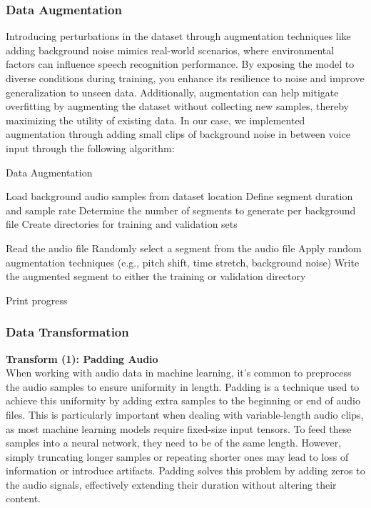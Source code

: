 \documentclass[a4paper]{report}
\begin{document}
{\subsubsection{Data Augmentation}
Introducing perturbations in the dataset through augmentation techniques like adding background noise mimics real-world scenarios, where environmental factors can influence speech recognition performance. By exposing the model to diverse conditions during training, you enhance its resilience to noise and improve generalization to unseen data. Additionally, augmentation can help mitigate overfitting by augmenting the dataset without collecting new samples, thereby maximizing the utility of existing data. In our case, we implemented augmentation through adding small clips of background noise in between voice input through the following algorithm:
\begin{center}
\begin{algorithm}
\caption{Data Augmentation}\label{alg:data_augmentation}
\begin{algorithmic}[0]
        \State Load background audio samples from dataset location
        \State Define segment duration and sample rate
        \State Determine the number of segments to generate per background file
        \State Create directories for training and validation sets

            \State Read the audio file
                \State Randomly select a segment from the audio file
                \State Apply random augmentation techniques (e.g., pitch shift, time stretch, background noise)
                \State Write the augmented segment to either the training or validation directory
            \EndFor
        \EndFor

        \State Print progress
    \EndProcedure
\end{algorithmic}
\end{algorithm}
\end{center}
\subsubsection{Data Transformation}
\textbf{Transform (1): Padding Audio}\\

When working with audio data in machine learning, it's common to preprocess the audio samples to ensure uniformity in length. Padding is a technique used to achieve this uniformity by adding extra samples to the beginning or end of audio files. This is particularly important when dealing with variable-length audio clips, as most machine learning models require fixed-size input tensors.
To feed these samples into a neural network, they need to be of the same length. However, simply truncating longer samples or repeating shorter ones may lead to loss of information or introduce artifacts. Padding solves this problem by adding zeros to the audio signals, effectively extending their duration without altering their content.

}
\end{document}
